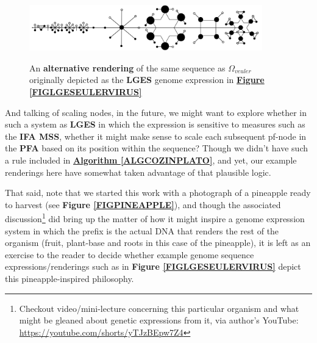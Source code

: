 \documentclass[a4paper, 18pt]{book} %
\begin{document}
\begin{figure}[H]
  \begin{center}
   \includegraphics[trim=0cm 0cm 0cm 0cm, clip, width=0.9\textwidth,]{resources/pdfs/v2-PLATONIC-EULERVIRUS-landscape.pdf}\\
   \caption{An \textbf{alternative rendering} of the same sequence as $\Omega_{veuler}$ originally depicted as the \textbf{LGES} genome expression in \textbf{\hyperref[FIGLGESEULERVIRUS]{Figure \ref{FIGLGESEULERVIRUS}}}}
  \label{FIGLGESEULERVIRUSv2}
  \end{center}
\end{figure}

And talking of scaling nodes, in the future, we might want to explore whether in such a system as \textbf{LGES} in which the expression is sensitive to measures such as the \textbf{IFA MSS}, whether it might make sense to scale each subsequent pf-node in the \textbf{PFA} based on its position within the sequence? Though we didn't have such a rule included in \textbf{\hyperref[ALGCOZINPLATO]{Algorithm \ref{ALGCOZINPLATO}}}, and yet, our example renderings here have somewhat taken advantage of that plausible logic.

That said, note that we started this work with a photograph of a pineapple ready to harvest (see \textbf{Figure \ref{FIGPINEAPPLE}}), and though the associated discussion\footnote{Checkout video/mini-lecture concerning this particular organism and what might be gleaned about genetic expressions from it, via author's YouTube: \url{https://youtube.com/shorts/yTJzBEpw7Z4}} did bring up the matter of how it might inspire a genome expression system in which the prefix is the actual DNA that renders the rest of the organism (fruit, plant-base and roots in this case of the pineapple), it is left as an exercise to the reader to decide whether example genome sequence expressions/renderings such as in \textbf{Figure \ref{FIGLGESEULERVIRUS}} depict this pineapple-inspired philosophy.
\end{document}
